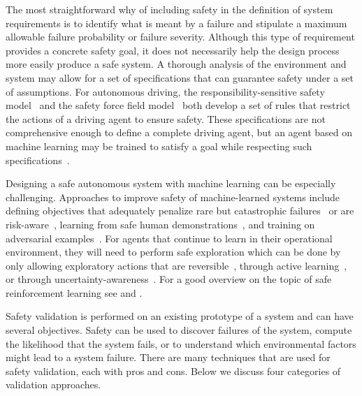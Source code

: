 The most straightforward why of including safety in the definition of system requirements is to identify what is meant by a failure and stipulate a maximum allowable failure probability or failure severity. Although this type of requirement provides a concrete safety goal, it does not necessarily help the design process more easily produce a safe system. A thorough analysis of the environment and system may allow for a set of specifications that can guarantee safety under a set of assumptions. For autonomous driving, the responsibility-sensitive safety model~\cite{shalev2017formal} and the safety force field model~\cite{nister2019safety} both develop a set of rules that restrict the actions of a driving agent to ensure safety. These specifications are not comprehensive enough to define a complete driving agent, but an agent based on machine learning may be trained to satisfy a goal while respecting such specifications~\cite{sadigh2014learning,bouton2019reinforcement}.

Designing a safe autonomous system with machine learning can be especially challenging. Approaches to improve safety of machine-learned systems include defining objectives that adequately penalize rare but catastrophic failures~\cite{moldovan2012risk} or are risk-aware~\cite{tamar2014policy}, learning from safe human demonstrations~\cite{abbeel2005exploration}, and training on adversarial examples~\cite{goodfellow2014explaining}. For agents that continue to learn in their operational environment, they will need to perform safe exploration which can be done by only allowing exploratory actions that are reversible~\cite{moldovan2012safe}, through active learning~\cite{garcia2013safe}, or through uncertainty-awareness~\cite{sui2015safe}. For a good overview on the topic of safe reinforcement learning see \textcite{garcia2015comprehensive} and \textcite{amodei2016concrete}. 


Safety validation is performed on an existing prototype of a system and can have several objectives. Safety can be used to discover failures of the system, compute the likelihood that the system fails, or to understand which environmental factors might lead to a system failure. There are many techniques that are used for safety validation, each with pros and cons. Below we discuss four categories of validation approaches. 

